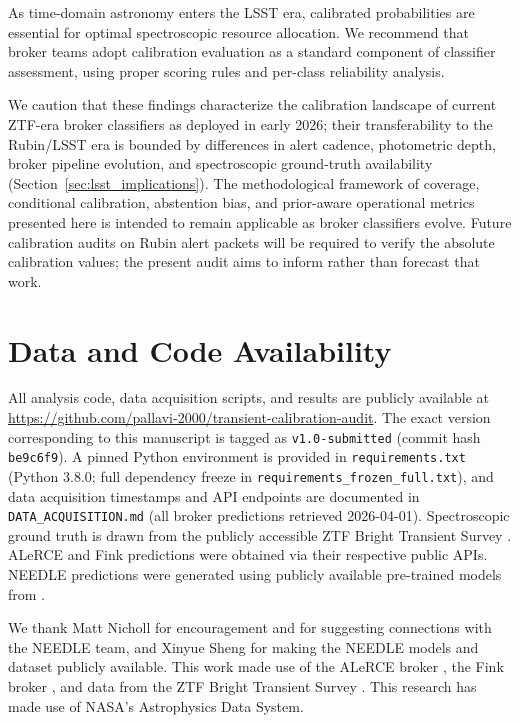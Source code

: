 \documentclass[twocolumn]{aastex631}
\begin{document}
As time-domain astronomy enters the LSST era, calibrated probabilities are essential for optimal spectroscopic resource allocation. We recommend that broker teams adopt calibration evaluation as a standard component of classifier assessment, using proper scoring rules and per-class reliability analysis.

We caution that these findings characterize the calibration landscape of
current ZTF-era broker classifiers as deployed in early 2026; their
transferability to the Rubin/LSST era is bounded by differences in alert
cadence, photometric depth, broker pipeline evolution, and spectroscopic
ground-truth availability (Section~\ref{sec:lsst_implications}). The
methodological framework of coverage, conditional calibration, abstention
bias, and prior-aware operational metrics presented here is intended to
remain applicable as broker classifiers evolve. Future calibration audits
on Rubin alert packets will be required to verify the absolute calibration
values; the present audit aims to inform rather than forecast that work.


\section*{Data and Code Availability}

All analysis code, data acquisition scripts, and results are publicly
available at \url{https://github.com/pallavi-2000/transient-calibration-audit}.
The exact version corresponding to this manuscript is tagged as
\texttt{v1.0-submitted} (commit hash \texttt{be9c6f9}).
A pinned Python environment is provided in \texttt{requirements.txt}
(Python 3.8.0; full dependency freeze in
\texttt{requirements\_frozen\_full.txt}), and data acquisition timestamps
and API endpoints are documented in \texttt{DATA\_ACQUISITION.md}
(all broker predictions retrieved 2026-04-01).
Spectroscopic ground truth is drawn from the publicly accessible ZTF
Bright Transient Survey \citep{fremling2020, perley2020}. ALeRCE and
Fink predictions were obtained via their respective public APIs. NEEDLE
predictions were generated using publicly available pre-trained models
from \citet{sheng2024}.


\begin{acknowledgments}
We thank Matt Nicholl for encouragement and for suggesting connections with the NEEDLE team, and Xinyue Sheng for making the NEEDLE models and dataset publicly available. This work made use of the ALeRCE broker \citep{forster2021}, the Fink broker \citep{moller2021}, and data from the ZTF Bright Transient Survey \citep{fremling2020, perley2020}. This research has made use of NASA's Astrophysics Data System.
\end{acknowledgments}
\end{document}
